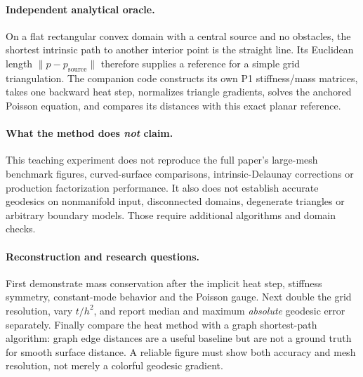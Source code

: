 \paragraph{Independent analytical oracle.}
On a flat rectangular convex domain with a central source and
no obstacles, the shortest intrinsic path to another interior
point is the straight line. Its Euclidean length
\(\lVert p-p_{\mathrm{source}}\rVert\) therefore supplies a reference
for a simple grid triangulation. The companion code constructs
its own P1 stiffness/mass matrices, takes one backward heat
step, normalizes triangle gradients, solves the anchored Poisson
equation, and compares its distances with this exact planar
reference.

\paragraph{What the method does \emph{not} claim.}
This teaching experiment does not reproduce the full paper's
large-mesh benchmark figures, curved-surface comparisons,
intrinsic-Delaunay corrections or production factorization
performance. It also does not establish accurate geodesics on
nonmanifold input, disconnected domains, degenerate triangles
or arbitrary boundary models. Those require additional algorithms
and domain checks.

\paragraph{Reconstruction and research questions.}
First demonstrate mass conservation after the implicit heat
step, stiffness symmetry, constant-mode behavior and the
Poisson gauge. Next double the grid resolution, vary \(t/h^2\),
and report median and maximum \emph{absolute} geodesic error
separately. Finally compare the heat method with a graph
shortest-path algorithm: graph edge distances are a useful
baseline but are not a ground truth for smooth surface distance.
A reliable figure must show both accuracy and mesh resolution,
not merely a colorful geodesic gradient.
